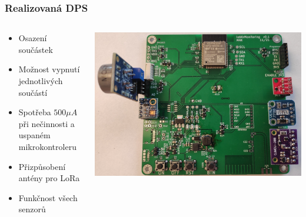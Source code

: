 \documentclass[%
  12pt,       				%
	t,                  %
	aspectratio=1610,   %
	unicode,						%
]{beamer}				    	%
\begin{document}
\begin{frame}
	\frametitle{Realizovaná DPS}
	\begin{columns}[T]
		\begin{column}{0.4\columnwidth}
			\vspace{0.5cm}
			\begin{itemize}
				\item Osazení součástek
				\item Možnost vypnutí jednotlivých součástí
				\item Spotřeba $500\mu A$ při nečinnosti a uspaném mikrokontroleru
				\item Přizpůsobení antény pro LoRa
				\item Funkčnost všech senzorů
			\end{itemize}
		\end{column}

		\begin{column}{0.6\columnwidth}
			\vspace{0.5cm}
			\centering
			\includegraphics[width=1\columnwidth]{obrazky/pcb-full.jpg}
		\end{column}
	\end{columns}
\end{frame}


\end{document}
